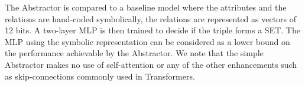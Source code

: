 The Abstractor is compared to a baseline model where the attributes and the relations are hand-coded symbolically, the relations are represented as vectors of 12 bits. A two-layer MLP is then trained to decide if the triple forms a SET. The MLP using the symbolic representation can be considered as a lower bound on the performance achievable by the Abstractor. We note that the simple Abstractor makes no use of self-attention or any of the other enhancements such as skip-connections commonly used in Transformers.
